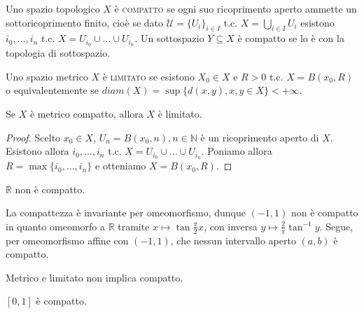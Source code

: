 \begin{defn}
  Uno spazio topologico $X$ è \textsc{compatto} se ogni suo ricoprimento aperto ammette un sottoricoprimento finito, cioè se dato $\mathcal{U}=\{U_i\}_{i \in I}$ t.c. $\displaystyle X=\bigcup_{i \in I} U_i$ esistono $i_0, \dots, i_n$ t.c. $X=U_{i_0} \cup \dots \cup U_{i_n}$. Un sottospazio $Y \subseteq X$ è compatto se lo è con la topologia di sottospazio.
\end{defn}

\begin{defn}
  Uno spazio metrico $X$ è \textsc{limitato} se esistono $X_0 \in X$ e $R>0$ t.c. $X=B(x_0, R)$ o equivalentemente se $diam(X)=\sup{\{d(x, y), x, y \in X\}}<+\infty$.
\end{defn}

\begin{lm}
  Se $X$ è metrico compatto, allora $X$ è limitato.
\end{lm}

\begin{proof}
  Scelto $x_0 \in X$, $U_n=B(x_0, n), n \in \mathbb{N}$ è un ricoprimento aperto di $X$. Esistono allora $i_0, \dots, i_n$ t.c. $X=U_{i_0} \cup \dots \cup U_{i_n}$. Poniamo allora $R=\max\{i_0, \dots, i_n\}$ e otteniamo $X=B(x_0, R)$.
\end{proof}

\begin{cor}
  $\mathbb{R}$ non è compatto.
\end{cor}

\begin{oss}
  La compattezza è invariante per omeomorfismo, dunque $(-1, 1)$ non è compatto in quanto omeomorfo a $\mathbb{R}$ tramite $x \longmapsto \tan{\frac{\pi}{2}x}$, con inversa $y \longmapsto \frac{2}{\pi}\tan^{-1}{y}$. Segue, per omeomorfismo affine con $(-1, 1)$, che nessun intervallo aperto $(a, b)$ è compatto.
\end{oss}

\begin{cor}
  Metrico e limitato non implica compatto.
\end{cor}

\begin{thm}
  $[0, 1]$ è compatto.
\end{thm}

